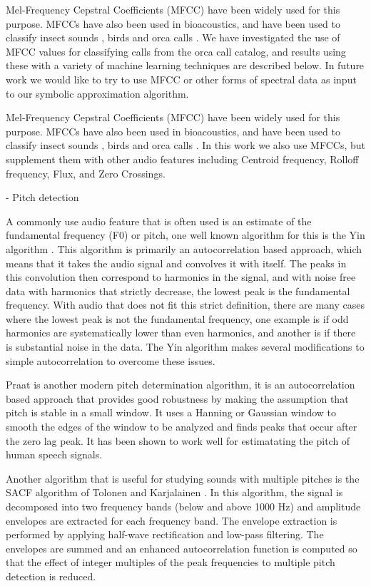 \documentclass[12pt,oneside]{book}
\begin{document}
Mel-Frequency Cepstral Coefficients \cite{Logan00melfrequency} (MFCC)
have been widely used for this purpose.  MFCCs have also been used in
bioacoustics, and have been used to classify insect sounds
\cite{leqing11}, birds \cite{changhsing07} and orca calls
\cite{ness08}.  We have investigated the use of MFCC values for
classifying calls from the orca call catalog, and results using these
with a variety of machine learning techniques are described below.  In
future work we would like to try to use MFCC or other forms of
spectral data as input to our symbolic approximation algorithm.

Mel-Frequency Cepstral Coefficients
\cite{Logan00melfrequency} (MFCC) have been widely used for this
purpose.  MFCCs have also been used in bioacoustics, and have been
used to classify insect sounds \cite{leqing11}, birds
\cite{changhsing07} and orca calls \cite{ness2008}.  In this work we
also use MFCCs, but supplement them with other audio features
including Centroid frequency, Rolloff frequency, Flux, and
Zero Crossings.


- Pitch detection


A commonly use audio feature that is often used is an estimate of the
fundamental frequency (F0) or pitch, one well known algorithm for this
is the Yin algorithm \cite{cheveigne02}.  This algorithm is primarily
an autocorrelation based approach, which means that it takes the audio
signal and convolves it with itself.  The peaks in this convolution
then correspond to harmonics in the signal, and with noise free data
with harmonics that strictly decrease, the lowest peak is the
fundamental frequency.  With audio that does not fit this strict
definition, there are many cases where the lowest peak is not the
fundamental frequency, one example is if odd harmonics are
systematically lower than even harmonics, and another is if there is
substantial noise in the data.  The Yin algorithm makes several
modifications to simple autocorrelation to overcome these issues.

Praat \cite{boersma93} is another modern pitch determination
algorithm, it is an autocorrelation based approach that provides good
robustness by making the assumption that pitch is stable in a small
window.  It uses a Hanning or Gaussian window to smooth the edges of
the window to be analyzed and finds peaks that occur after the zero
lag peak.  It has been shown to work well for estimatating the pitch
of human speech signals.

Another algorithm that is useful for studying sounds with multiple
pitches is the SACF algorithm of Tolonen and Karjalainen
\cite{tolonen00}.  In this algorithm, the signal is decomposed into
two frequency bands (below and above 1000 Hz) and amplitude envelopes
are extracted for each frequency band. The envelope extraction is
performed by applying half-wave rectification and low-pass filtering.
The envelopes are summed and an enhanced autocorrelation function is
computed so that the effect of integer multiples of the peak
frequencies to multiple pitch detection is reduced.
\end{document}
